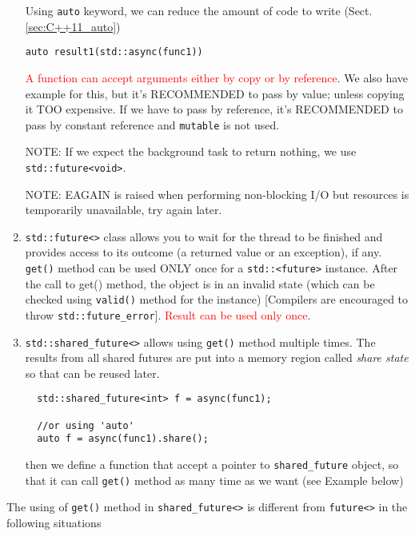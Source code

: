 \begin{enumerate}
\begin{mdframed}
Using \verb!auto! keyword, we can reduce the amount of code to write
(Sect.\ref{sec:C++11_auto})
\begin{verbatim}
auto result1(std::async(func1))
\end{verbatim}
\textcolor{red}{A function can accept arguments either by copy or by reference}.
We also have example for this, but it's RECOMMENDED to pass by value; unless
copying it TOO expensive. If we have to pass by reference, it's RECOMMENDED to
pass by constant reference and \verb!mutable! is not used.

NOTE: If we expect the background task to return nothing, we use
\verb!std::future<void>!.
\end{mdframed}
  
  NOTE: EAGAIN is raised when performing non-blocking I/O but resources is
  temporarily unavailable, try again later. 
  
  \item \verb!std::future<>! class allows you to wait for the thread to be
  finished and provides access to its outcome (a returned value or an
  exception), if any. \verb!get()! method can be used ONLY once for a
  \verb!std::<future>! instance. After the call to get() method, the object is
  in an invalid state (which can be checked using \verb!valid()! method for the
  instance) [Compilers are encouraged to throw \verb!std::future_error!].
  \textcolor{red}{Result can be used only once}.
  
  \item \verb!std::shared_future<>! allows using \verb!get()! method multiple
  times. The results from all shared futures are put into a memory region called
  {\it share state} so that can be reused later.
  \begin{lstlisting}
  std::shared_future<int> f = async(func1);
  
  //or using 'auto'
  auto f = async(func1).share();
  \end{lstlisting}
  then we define a function that accept a pointer to \verb!shared_future!
  object, so that it can call \verb!get()! method as many time as we want (see
  Example below)
\end{enumerate}

The using of \verb!get()! method in \verb!shared_future<>! is different
from \verb!future<>! in the following situations

